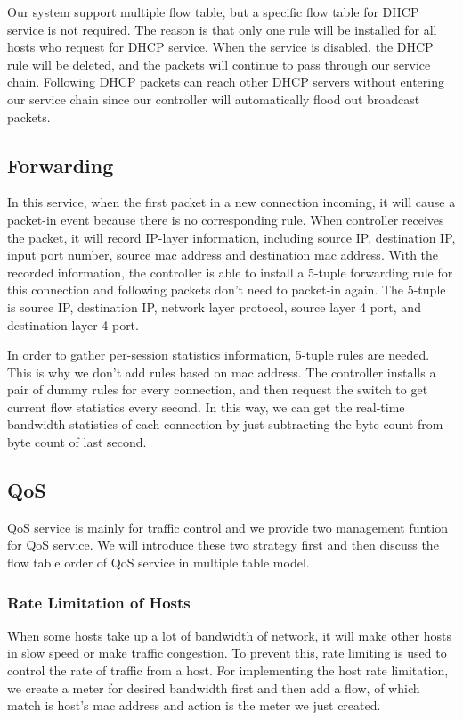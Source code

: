 \documentclass[journal]{IEEEtran}
\begin{document}
Our system support multiple flow table, but a specific flow table for DHCP service is not required.
The reason is that only one rule will be installed for all hosts who request for DHCP service.
When the service is disabled, the DHCP rule will be deleted,
and the packets will continue to pass through our service chain.
Following DHCP packets can reach other DHCP servers without entering our service chain
since our controller will automatically flood out broadcast packets.



\subsection{Forwarding} \label{ssec:forwarding}
In this service, when the first packet in a new connection incoming, it will cause a packet-in event because there is no corresponding rule. When controller receives the packet, it will record IP-layer information, including source IP, destination IP, input port number, source mac address and destination mac address. With the recorded information, the controller is able to install a 5-tuple forwarding rule for this connection and following packets don’t need to packet-in again. The 5-tuple is source IP, destination IP, network layer protocol, source layer 4 port, and destination layer 4 port.

In order to gather per-session statistics information, 5-tuple rules are needed. This is why we don’t add rules  based on mac address.  The controller installs a pair of dummy rules for every connection, and then request the switch to get current flow statistics every second. In this way, we can get the real-time bandwidth statistics of each connection by just subtracting the byte count from byte count of last second.



\subsection{QoS}
QoS service is mainly for traffic control and we provide two management funtion for QoS service. We will introduce these two strategy first and then discuss the flow table order of QoS service in multiple table model.

\subsubsection{Rate Limitation of Hosts}
When some hosts take up a lot of bandwidth of network, it will make other hosts in slow speed or make traffic congestion. To prevent this, rate limiting is used to control the rate of traffic from a host. For implementing the host rate limitation, we create a meter for desired bandwidth first and then add a flow, of which match is host’s mac address and action is the meter we just created.
\end{document}
